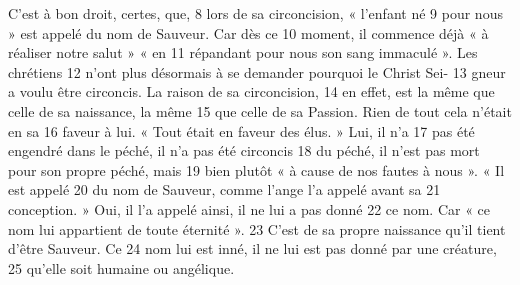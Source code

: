 C'est à bon droit, certes, que,	 
8	 	lors de sa circoncision, « l'enfant né	 
9	 	pour nous » est appelé du nom de Sauveur. Car dès ce	 
10	 	moment, il commence déjà « à réaliser notre salut » « en	 
11	 	répandant pour nous son sang immaculé ». Les chrétiens	 
12	 	n'ont plus désormais à se demander pourquoi le Christ Sei-	 
13	 	gneur a voulu être circoncis. La raison de sa circoncision,	 
14	 	en effet, est la même que celle de sa naissance, la même	 
15	 	que celle de sa Passion. Rien de tout cela n'était en sa	 
16	 	faveur à lui. « Tout était en faveur des élus. » Lui, il n'a	 
17	 	pas été engendré dans le péché, il n'a pas été circoncis	 
18	 	du péché, il n'est pas mort pour son propre péché, mais	 
19	 	bien plutôt « à cause de nos fautes à nous ». « Il est appelé	 
20	 	du nom de Sauveur, comme l'ange l'a appelé avant sa	 
21	 	conception. » Oui, il l'a appelé ainsi, il ne lui a pas donné	 
22	 	ce nom. Car « ce nom lui appartient de toute éternité ».	 
23	 	C'est de sa propre naissance qu'il tient d'être Sauveur. Ce	 
24	 	nom lui est inné, il ne lui est pas donné par une créature,	 
25	 	qu'elle soit humaine ou angélique.